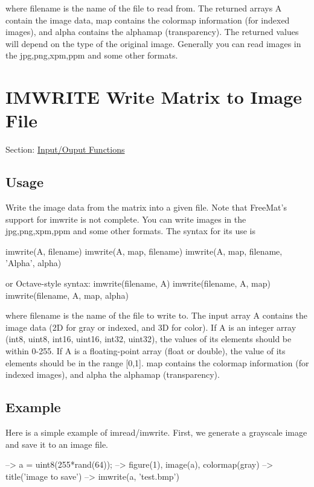  where {\ttfamily filename} is the name of the file to read from. The returned arrays {\ttfamily A} contain the image data, {\ttfamily map} contains the colormap information (for indexed images), and {\ttfamily alpha} contains the alphamap (transparency). The returned values will depend on the type of the original image. Generally you can read images in the {\ttfamily jpg,png,xpm,ppm} and some other formats. \hypertarget{io_imwrite}{}\section{I\-M\-W\-R\-I\-T\-E Write Matrix to Image File}\label{io_imwrite}
Section\-: \hyperlink{sec_io}{Input/\-Ouput Functions} \hypertarget{vtkwidgets_vtkxyplotwidget_Usage}{}\subsection{Usage}\label{vtkwidgets_vtkxyplotwidget_Usage}
Write the image data from the matrix into a given file. Note that Free\-Mat's support for {\ttfamily imwrite} is not complete. You can write images in the {\ttfamily jpg,png,xpm,ppm} and some other formats. The syntax for its use is \begin{DoxyVerb}  imwrite(A, filename)
  imwrite(A, map, filename)
  imwrite(A, map, filename, 'Alpha', alpha)

or Octave-style syntax:
  imwrite(filename, A)
  imwrite(filename, A, map)
  imwrite(filename, A, map, alpha)
\end{DoxyVerb}
 where {\ttfamily filename} is the name of the file to write to. The input array {\ttfamily A} contains the image data (2\-D for gray or indexed, and 3\-D for color). If {\ttfamily A} is an integer array (int8, uint8, int16, uint16, int32, uint32), the values of its elements should be within 0-\/255. If {\ttfamily A} is a floating-\/point array (float or double), the value of its elements should be in the range \mbox{[}0,1\mbox{]}. {\ttfamily map} contains the colormap information (for indexed images), and {\ttfamily alpha} the alphamap (transparency). \hypertarget{variables_struct_Example}{}\subsection{Example}\label{variables_struct_Example}
Here is a simple example of {\ttfamily imread}/{\ttfamily imwrite}. First, we generate a grayscale image and save it to an image file.


\begin{DoxyVerbInclude}
--> a =  uint8(255*rand(64));
--> figure(1), image(a), colormap(gray)
--> title('image to save')
--> imwrite(a, 'test.bmp')
\end{DoxyVerbInclude}


